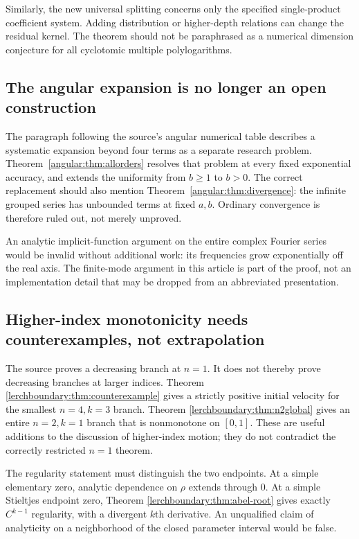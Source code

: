 Similarly, the new universal splitting concerns only the specified
single-product coefficient system. Adding distribution or higher-depth
relations can change the residual kernel. The theorem should not be
paraphrased as a numerical dimension conjecture for all cyclotomic
multiple polylogarithms.

\subsection{The angular expansion is no longer an open construction}

The paragraph following the source's angular numerical table describes
a systematic expansion beyond four terms as a separate research
problem. Theorem~\ref{angular:thm:allorders} resolves that problem at
every fixed exponential accuracy, and extends the uniformity from
$b\geq1$ to $b>0$. The correct replacement should also mention
Theorem~\ref{angular:thm:divergence}: the infinite grouped series has
unbounded terms at fixed $a,b$. Ordinary convergence is therefore
ruled out, not merely unproved.

An analytic implicit-function argument on the entire complex Fourier
series would be invalid without additional work: its frequencies grow
exponentially off the real axis. The finite-mode argument in this
article is part of the proof, not an implementation detail that may
be dropped from an abbreviated presentation.

\subsection{Higher-index monotonicity needs counterexamples, not extrapolation}

The source proves a decreasing branch at $n=1$. It does not thereby
prove decreasing branches at larger indices. Theorem
\ref{lerchboundary:thm:counterexample} gives a strictly positive initial
velocity for the smallest $n=4,k=3$ branch. Theorem
\ref{lerchboundary:thm:n2global} gives an entire $n=2,k=1$ branch that
is nonmonotone on $[0,1]$. These are useful additions to the discussion
of higher-index motion; they do not contradict the correctly restricted
$n=1$ theorem.

The regularity statement must distinguish the two endpoints. At a
simple elementary zero, analytic dependence on $\rho$ extends through
$0$. At a simple Stieltjes endpoint zero, Theorem
\ref{lerchboundary:thm:abel-root} gives exactly $C^{k-1}$ regularity,
with a divergent $k$th derivative. An unqualified claim of analyticity
on a neighborhood of the closed parameter interval would be false.

